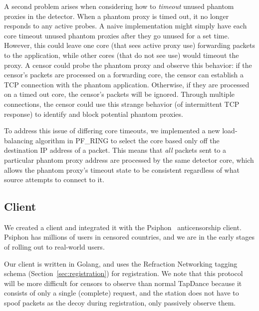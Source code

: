 \documentclass[sigconf]{acmart}
\begin{document}
A second problem arises when considering how to \emph{timeout} unused phantom proxies
in the detector. When a phantom proxy is timed out, it no longer responds to any
active probes. A naive implementation might simply have each core timeout unused
phantom proxies after they go unused for a set time. However, this could leave
one core (that sees active proxy use) forwarding packets to the application, while
other cores (that do not see use) would timeout the proxy. A censor could probe the
phantom proxy and observe this behavior: if the censor's packets are processed
on a forwarding core, the censor can establish a TCP connection with the phantom
application. Otherwise, if they are processed on a timed out core, the censor's packets
will be ignored. Through multiple connections, the censor could use this strange
behavior (of intermittent TCP response) to identify and block potential phantom
proxies.

To address this issue of differing core timeouts, we implemented a new
load-balancing algorithm in
PF\_RING to select the core based only off the destination IP address of a
packet. This means that \emph{all} packets sent to a particular phantom proxy address
are processed by the same detector core, which allows the phantom proxy's timeout state
to be consistent regardless of what source attempts to connect to it.


\subsection{Client}


We created a \scheme client and integrated it with the Psiphon~\cite{psiphon}
anticensorship client. Psiphon has millions of users in censored countries, and
we are in the early stages of rolling \scheme out to real-world users.

Our \scheme client is written in Golang, and uses the Refraction Networking tagging
schema (Section~\ref{sec:registration}) for
registration. We note that this protocol will be more difficult for censors to observe
than normal TapDance because it consists of only a single (complete) request, and the station does
not have to spoof packets as the decoy during registration, only passively
observe them. 
\end{document}
